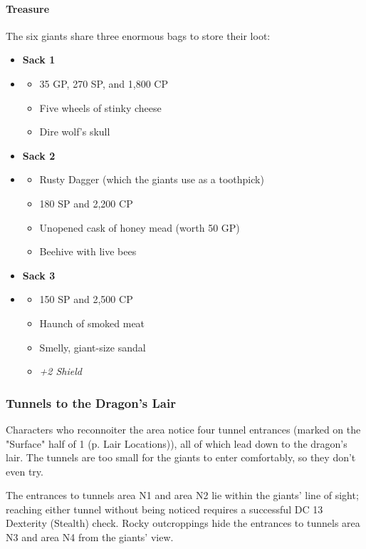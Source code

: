 \documentclass[letterpaper, 11pt, twocolumn]{dndbook}
\begin{document}
\paragraph{Treasure}

The six giants share three enormous bags to store their loot:

\begin{itemize}
\item \textbf{Sack 1}
\item \begin{itemize}
\item 35 GP, 270 SP, and 1,800 CP
\item Five wheels of stinky cheese
\item Dire wolf's skull
\end{itemize}
\item \textbf{Sack 2}
\item \begin{itemize}
\item Rusty Dagger (which the giants use as a toothpick)
\item 180 SP and 2,200 CP
\item Unopened cask of honey mead (worth 50 GP)
\item Beehive with live bees
\end{itemize}
\item \textbf{Sack 3}
\item \begin{itemize}
\item 150 SP and 2,500 CP
\item Haunch of smoked meat
\item Smelly, giant-size sandal
\item \textit{+2 Shield}
\end{itemize}
\end{itemize}

\subsubsection{Tunnels to the Dragon's Lair}

Characters who reconnoiter the area notice four tunnel entrances (marked on the "Surface" half of 1 (p. Lair Locations)), all of which lead down to the dragon's lair. The tunnels are too small for the giants to enter comfortably, so they don't even try.

The entrances to tunnels area N1 and area N2 lie within the giants' line of sight; reaching either tunnel without being noticed requires a successful DC 13 Dexterity (Stealth) check. Rocky outcroppings hide the entrances to tunnels area N3 and area N4 from the giants' view.
\end{document}
